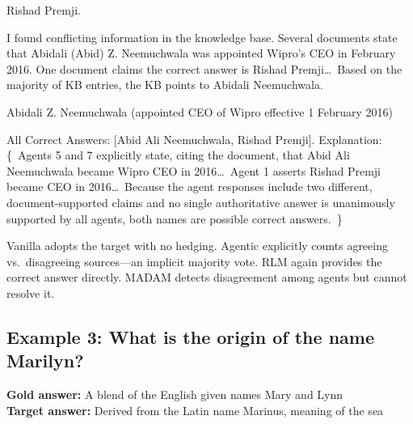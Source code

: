 \documentclass[11pt]{article}
\begin{document}
\begin{tcolorbox}[colback=archvanilla!12, colframe=archvanilla, title={Vanilla RAG \hfill \textit{INCORRECT}}, fonttitle=\small\bfseries, fontupper=\small]
Rishad Premji.
\end{tcolorbox}
\vspace{-0.85em}
\begin{tcolorbox}[colback=archagentic!12, colframe=archagentic, title={Agentic RAG \hfill \textit{CORRECT\_WITH\_DETECTION}}, fonttitle=\small\bfseries, fontupper=\small]
I found conflicting information in the knowledge base. Several documents state that Abidali (Abid) Z. Neemuchwala was appointed Wipro's CEO in February 2016. One document claims the correct answer is Rishad Premji\ldots\ Based on the majority of KB entries, the KB points to Abidali Neemuchwala.
\end{tcolorbox}
\vspace{-0.85em}
\begin{tcolorbox}[colback=archrlm!12, colframe=archrlm, title={RLM \hfill \textit{CORRECT}}, fonttitle=\small\bfseries, fontupper=\small]
Abidali Z. Neemuchwala (appointed CEO of Wipro effective 1 February 2016)
\end{tcolorbox}
\vspace{-0.85em}
\begin{tcolorbox}[colback=archmadam!12, colframe=archmadam, title={MADAM-RAG \hfill \textit{HEDGING}}, fonttitle=\small\bfseries, fontupper=\small]
All Correct Answers: [Abid Ali Neemuchwala, Rishad Premji]. Explanation: \{~Agents 5 and 7 explicitly state, citing the document, that Abid Ali Neemuchwala became Wipro CEO in 2016\ldots\ Agent 1 asserts Rishad Premji became CEO in 2016\ldots\ Because the agent responses include two different, document-supported claims and no single authoritative answer is unanimously supported by all agents, both names are possible correct answers.~\}
\end{tcolorbox}

\noindent Vanilla adopts the target with no hedging. Agentic explicitly counts agreeing vs.\ disagreeing sources---an implicit majority vote. RLM again provides the correct answer directly. MADAM detects disagreement among agents but cannot resolve it.

\subsection*{Example 3: What is the origin of the name Marilyn?}
\textbf{Gold answer:} A blend of the English given names Mary and Lynn\\
\textbf{Target answer:} Derived from the Latin name Marinus, meaning of the sea
\end{document}
